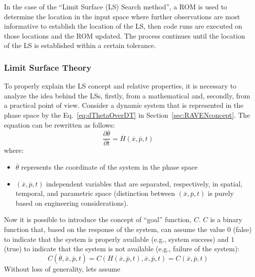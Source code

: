 In the case of the ``Limit 
Surface (LS) Search method'', a ROM is used to 
determine the location in the input space where further observations are most 
informative to establish the location of the LS, then code runs are 
executed on those locations and the ROM updated. The process 
continues until the location of the LS is established within a certain tolerance.

\subsubsection{Limit Surface Theory}
\label{sec:LSconcept}	

To properly explain the LS concept and relative properties, 
it is necessary to analyze the idea behind the LSs, firstly, from a 
mathematical and, secondly, from a practical point of view.
Consider a dynamic system that is represented in the phase space by the Eq.~\ref{eq:dThetaOverDT} in Section~\ref{sec:RAVENconcept}. 
The equation can be rewritten as follows:
\begin{equation}
\label{eq:ThetaXPT}
\frac{\partial \overline{\theta} }{\partial t}=\overline{H}\left (  \overline{x},\overline{p},t \right )
\end{equation}
where:
\begin{itemize}
  \item $\overline{\theta}$ represents the coordinate of the system in the 
  phase space
  \item $\left (  \overline{x},\overline{p},t \right )$ independent variables 
  that are separated, respectively, in spatial, temporal, and parametric  
  space (distinction between $\left (  \overline{x},\overline{p},t \right )$ is purely based on engineering considerations).
\end{itemize}
Now it is possible to introduce the concept of ``goal'' function, $C$. $C$ 
is a binary function that, based on the response of the system, can 
assume the value $0$ (false) to indicate that the system is properly 
available (e.g., system success) and $1$ (true) to indicate that the 
system is not available (e.g., failure of the system):
\begin{equation}
C\left (\overline{\theta}, \overline{x},\overline{p},t \right ) = C\left (H\left(\overline{x},\overline{p},t \right), \overline{x},\overline{p},t \right ) = C\left ( \overline{x},\overline{p},t \right ) 
\end{equation}
Without loss of generality, lets assume 
